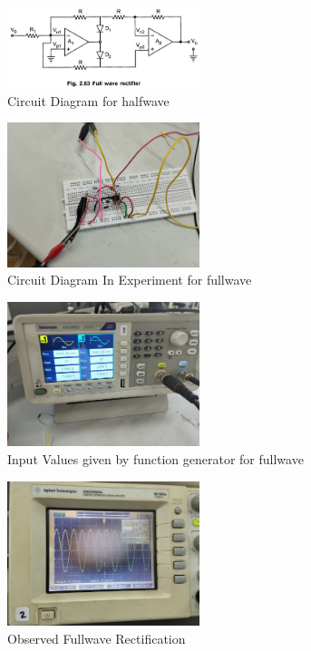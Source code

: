 \documentclass[a4paper,12pt]{article}
\begin{document}
\begin{figure}[H]
    \centering
    \includegraphics[width=0.5\textwidth]{figs/fullwave_ideal.png}
    \caption{Circuit Diagram for halfwave}
\end{figure}
\begin{figure}[H]
    \centering
    \includegraphics[width=0.5\textwidth]{figs/fullwave2.png}
    \caption{Circuit Diagram In Experiment for fullwave}
\end{figure}
\begin{figure}[H]
    \centering
    \includegraphics[width=0.5\textwidth]{figs/fullwave3.png}
    \caption{Input Values given by function generator for fullwave}
\end{figure}
\begin{figure}[H]
    \centering
    \includegraphics[width=0.5\textwidth]{figs/fullwave1.png}
    \caption{Observed Fullwave Rectification}
\end{figure}
\end{document}

